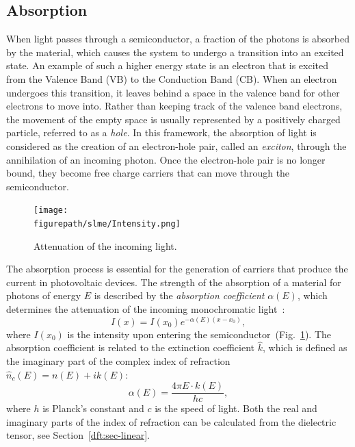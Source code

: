\begin{refsection}
\subsection{Absorption}\label{slme:sec-absorption} 
 
When light passes through a semiconductor, a fraction of the photons is 
absorbed by the material, which causes the system to undergo a transition into 
an excited state. An example of such a higher energy state is an electron that 
is excited from the Valence Band (VB) to the Conduction Band (CB). When an 
electron undergoes this transition, it leaves behind a space in the valence 
band for other electrons to move into. Rather than keeping track of the 
valence band electrons, the movement of the empty space is usually represented 
by a positively charged particle, referred to as a \textit{hole}. In this 
framework, the absorption of light is considered as the creation of an 
electron-hole pair, called an \textit{exciton}, through the annihilation of an 
incoming photon. Once the electron-hole pair is no longer bound, they become 
free charge carriers that can move through the semiconductor. 
 
\begin{figure}
\centering 
\captionsetup{width=0.35\textwidth} 
\texttt{[image: \\figurepath/slme/Intensity.png]} 
\caption{\label{slme:fig-intensity} Attenuation of the incoming light.} 
\end{figure} 
 
The absorption process is essential for the generation of carriers that 
produce the current in photovoltaic devices. The strength of the absorption of 
a material for photons of energy $E$ is described by the \textit{absorption 
coefficient} $\alpha(E)$, which determines the attenuation of the incoming 
monochromatic light~\cite{Green1981}: 
\begin{equation}\label{slme:eq-intensity} 
I(x) = I(x_0)e^{-\alpha(E) (x - x_0)}, 
\end{equation} 
where $I(x_0)$ is the intensity upon entering the 
semiconductor~(Fig.~\ref{slme:fig-intensity}). The absorption coefficient is 
related to the extinction coefficient $\hat{k}$, which is defined as the 
imaginary part of the complex index of refraction $\hat{n}_c(E)=n(E)+ik(E)$: 
\begin{equation}\label{slme:eq-absorption} 
\alpha (E)= \frac{4 \pi E \cdot k(E)}{h c}, 
\end{equation} 
where $h$ is Planck's constant and $c$ is the speed of light. Both the real 
and imaginary parts of the index of refraction can be calculated from the 
dielectric tensor, see Section~\ref{dft:sec-linear}. 
 

\end{refsection}
